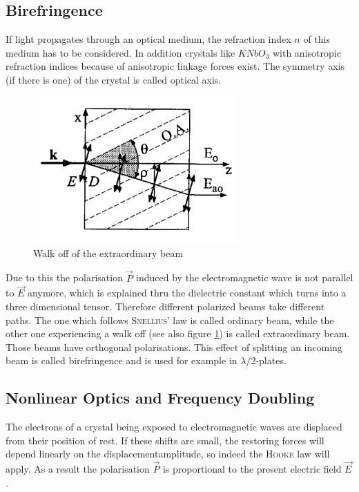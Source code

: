 \documentclass{protokoll_en}
\begin{document}
\subsection{Birefringence}
\label{cha:bi}
If light propagates through an optical medium, the refraction index $n$ of this medium has to be considered. In addition crystals like $KNbO_3$ with anisotropic refraction indices because of anisotropic linkage forces exist. The symmetry axis (if there is one) of the crystal is called optical axis. 
\begin{figure}[H]
	\centering
		\includegraphics[width=0.7\textwidth]{graphics/brech}
	\caption{Walk off of the extraordinary beam~\cite{meschi}}
	\label{fig:brech}
\end{figure}
Due to this the polarisation $\vec{P}$ induced by the electromagnetic wave is not parallel to $\vec{E}$ anymore, which is explained thru the dielectric constant which turns into a three dimensional tensor. Therefore different polarized beams take different paths. The one which follows \textsc{Snellius'} law is called ordinary beam, while the other one experiencing a walk off (see also figure \ref{fig:brech}) is called extraordinary beam. Those beams have orthogonal polarisations. This effect of splitting an incoming beam is called birefringence and is used for example in $\lambda/2$-plates.


\subsection{Nonlinear Optics and Frequency Doubling}
The electrons of a crystal being exposed to electromagnetic waves are displaced from their position of rest. If these shifts are small, the restoring forces will depend linearly on the displacementamplitude, so indeed the \textsc{Hooke} law will apply. As a result the polarisation $\vec{P}$ is proportional to the present electric field $\vec{E}$. 
\end{document}
